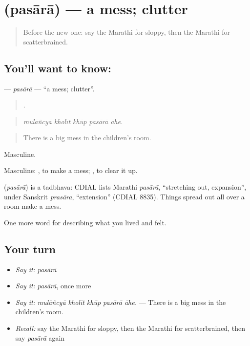 \section[\texorpdfstring{\mr{पसारा} (pasārā)}{पसारा (pasārā)}]{ (pasārā) — a mess; clutter}

\label{lesson:MR-C474-pasara}



\begin{quote}
Before the new one: say the Marathi for sloppy, then the Marathi for scatterbrained.
\end{quote}

\subsection*{You'll want to know: }
\textbf{} — \emph{pasārā} — \textquotedblleft{}a mess; clutter\textquotedblright{}.

\begin{quote}
    .
\end{quote}

\begin{quote}
\emph{mulāñcyā kholīt khūp pasārā āhe.}
\end{quote}

\begin{quote}
There is a big mess in the children's room.
\end{quote}

Masculine.

Masculine:  , to make a mess;  , to clear it up.

\begin{cousinweb}
\textbf{} (\emph{pasārā}) is a tadbhava: CDIAL lists Marathi \emph{pasārā}, \textquotedblleft{}stretching out, expansion\textquotedblright{}, under Sanskrit \emph{prasāra}, \textquotedblleft{}extension\textquotedblright{} (CDIAL 8835). Things spread out all over a room make a mess.
\end{cousinweb}

\begin{grammarlens}[title={What you've built}]
One more word for describing what you lived and felt.
\end{grammarlens}

\subsection*{Your turn}
\begin{itemize}
\raggedright
  \item \emph{Say it:} \emph{pasārā}
  \item \emph{Say it:} \emph{pasārā}, once more
  \item \emph{Say it:} \emph{mulāñcyā kholīt khūp pasārā āhe.} — There is a big mess in the children's room.
  \item \emph{Recall:} say the Marathi for sloppy, then the Marathi for scatterbrained, then say \emph{pasārā} again
\end{itemize}


